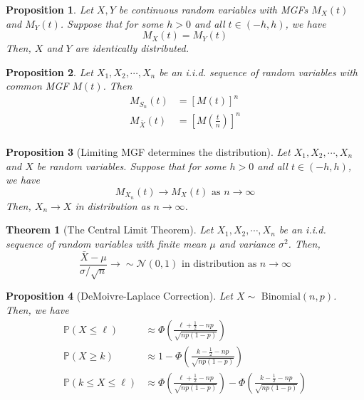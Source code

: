 \documentclass[
]{article}
\newtheorem{theorem}{Theorem}[section]
\newtheorem{proposition}{Proposition}[section]
\theoremstyle{definition}
\theoremstyle{definition}
\theoremstyle{definition}
\theoremstyle{remark}
\newcommand{\prob}[1]{\mathbb{P}\left(#1\right)}
\newcommand{\bin}[1]{\sim\text{ Binomial}\left( #1 \right)}
\newcommand{\norm}[2]{\sim\mathcal{N}\left( #1, #2 \right)}
\begin{document}
\begin{proposition}
  Let $X, Y$ be continuous random variables with MGFs $M_X(t)$ and $M_Y(t)$. Suppose that for some $h > 0$ and all $t\in(-h, h)$, we have
  \[M_X(t) = M_Y(t)\]
  Then, $X$ and $Y$ are identically distributed.
\end{proposition}

\begin{proposition}
  Let $X_1, X_2, \cdots, X_n$ be an i.i.d. sequence of random variables with common MGF $M(t)$. Then
  \begin{align*}
    M_{S_n}(t)     & = \left[M(t)\right]^n           \\
    M_{\bar{X}}(t) & = \left[M(\frac{t}{n})\right]^n \\
  \end{align*}
\end{proposition}

\begin{proposition} [Limiting MGF determines the distribution]
  Let $X_1, X_2, \cdots, X_n$ and $X$ be random variables. Suppose that for some $h > 0$ and all $t \in (-h, h)$, we have
  \[M_{X_n}(t) \rightarrow M_X(t) \text{ as } n \rightarrow \infty\]
  Then, $X_n \rightarrow X$ in distribution as $n \rightarrow \infty$.
\end{proposition}

\begin{theorem} [The Central Limit Theorem]
  Let $X_1, X_2, \cdots, X_n$ be an i.i.d. sequence of random variables with finite mean $\mu$ and variance $\sigma^2$. Then,
  \[\frac{\bar{X} - \mu}{\sigma / \sqrt{n}} \rightarrow \norm{0}{1} \text{ in distribution as } n \rightarrow \infty\]
\end{theorem}

\begin{proposition} [DeMoivre-Laplace Correction]
  Let $X\bin{n, p}$. Then, we have
  \begin{align*}
    \prob{X \leq \ell}        & \approx \Phi \left(\frac{\ell + \frac{1}{2} - np}{\sqrt{np(1-p)}}\right)                                                                 \\
    \prob{X \geq k}           & \approx 1 - \Phi \left(\frac{k - \frac{1}{2} - np}{\sqrt{np(1-p)}}\right)                                                                \\
    \prob{k \leq X \leq \ell} & \approx \Phi \left(\frac{\ell + \frac{1}{2} - np}{\sqrt{np(1-p)}}\right) - \Phi \left(\frac{k - \frac{1}{2} - np}{\sqrt{np(1-p)}}\right) \\
  \end{align*}
\end{proposition}
\end{document}

